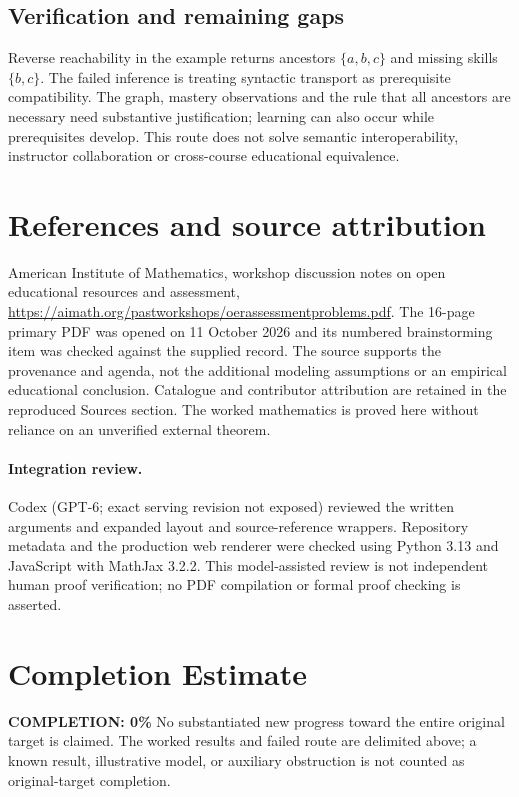 \documentclass[11pt]{article}
\begin{document}
\subsection{Verification and remaining gaps}
Reverse reachability in the example returns ancestors $\{a,b,c\}$ and missing skills $\{b,c\}$. The failed inference is treating syntactic transport as prerequisite compatibility. The graph, mastery observations and the rule that all ancestors are necessary need substantive justification; learning can also occur while prerequisites develop. This route does not solve semantic interoperability, instructor collaboration or cross-course educational equivalence.

\section{References and source attribution}
American Institute of Mathematics, workshop discussion notes on open educational resources and assessment, \url{https://aimath.org/pastworkshops/oerassessmentproblems.pdf}. The 16-page primary PDF was opened on 11 October 2026 and its numbered brainstorming item was checked against the supplied record. The source supports the provenance and agenda, not the additional modeling assumptions or an empirical educational conclusion. Catalogue and contributor attribution are retained in the reproduced Sources section. The worked mathematics is proved here without reliance on an unverified external theorem.


\paragraph{Integration review.} Codex (GPT-6; exact serving revision not exposed) reviewed the written arguments and expanded layout and source-reference wrappers. Repository metadata and the production web renderer were checked using Python 3.13 and JavaScript with MathJax 3.2.2. This model-assisted review is not independent human proof verification; no PDF compilation or formal proof checking is asserted.

\section{Completion Estimate}
\noindent\textbf{COMPLETION: 0\%}
No substantiated new progress toward the entire original target is claimed. The worked results and failed route are delimited above; a known result, illustrative model, or auxiliary obstruction is not counted as original-target completion.
\end{document}
